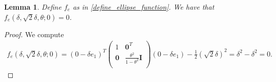 \documentclass{article}
\newtheorem{lemma}[theorem]{Lemma}
\theoremstyle{case}
\begin{document}
\begin{lemma}
\label{ellipse_fits}
Define $f_e$ as in \cref{define_ellipse_function}.
We have that $f_e(\delta, \sqrt{2}\delta, \theta; 0) = 0$.
\end{lemma}
\begin{proof}
We compute
\begin{align*}
f_e(\delta, \sqrt{2}\delta, \theta; 0) =(0 - \delta e_1)^T\begin{pmatrix}
1 & \boldsymbol0^T \\
\boldsymbol 0 & \frac{\theta^2}{1 - \theta^2} \boldsymbol I \\
\end{pmatrix}(0 - \delta e_1) - \frac 1 2 (\sqrt 2 \delta)^2
=\delta^2 - \delta^2 = 0.
\end{align*}
\end{proof}
\end{document}
